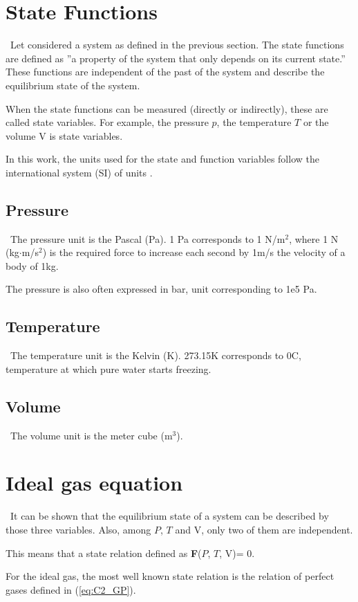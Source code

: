 \section{State Functions}\label{sect:C2_State}
\quad\, Let considered a system as defined in the previous section. The state functions are defined as ''a property of the system that only depends on its current state.” These functions are independent of the past of the system and describe the equilibrium state of the system.

When the state functions can be measured (directly or indirectly), these are called state variables. For example, the pressure $p$, the temperature $T$ or the volume $\mathrm{V}$ is state variables.

In this work, the units used for the state and function variables follow the international system (SI) of units \cite{Nist}. 
\subsection{Pressure}
\quad\, The pressure unit is the Pascal (Pa). 1 Pa corresponds to 1 N/m$^2$, where 1 N (kg$\cdot$m/s$^2$) is the required force to increase each second by 1m/s the velocity of a body of 1kg.

The pressure is also often expressed in bar, unit corresponding to 1e5 Pa.
\subsection{Temperature}
\quad\, The temperature unit is the Kelvin (K). 273.15\degree K corresponds to 0\degree C, temperature at which pure water starts freezing.
\subsection{Volume}
\quad\, The volume unit is the meter cube (m$^3$).
\section{Ideal gas equation}
\quad\, It can be shown that the equilibrium state of a system can be described by those three variables. Also, among $P$, $T$ and $\mathrm{V}$, only two of them are independent. 

This means that a state relation defined as \textbf{F}($P$, $T$, $\mathrm{V}$)= 0.

For the ideal gas, the most well known state relation is the relation of perfect gases defined in (\ref{eq:C2_GP}).

